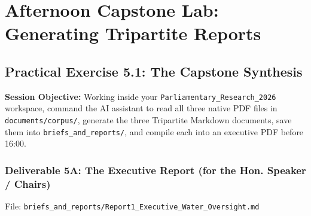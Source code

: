 \documentclass[11pt, a4paper]{report}
\begin{document}
\vspace{1.5em}
\noindent{}
\vspace{1.5em}

\newpage

\chapter{Afternoon Capstone Lab: Generating Tripartite Reports}

\section{Practical Exercise 5.1: The Capstone Synthesis}
\textbf{Session Objective:} Working inside your \texttt{Parliamentary\_Research\_2026} workspace, command the AI assistant to read all three native PDF files in \texttt{documents/corpus/}, generate the three Tripartite Markdown documents, save them into \texttt{briefs\_and\_reports/}, and compile each into an executive PDF before 16:00.

\subsection{Deliverable 5A: The Executive Report (for the Hon. Speaker / Chairs)}
File: \texttt{briefs\_and\_reports/Report1\_Executive\_Water\_Oversight.md}
\end{document}
